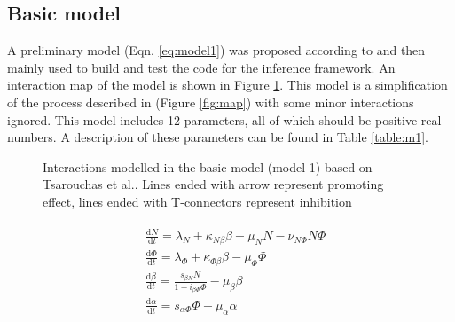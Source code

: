 \subsection{Basic model}

A preliminary model (Eqn. \ref{eq:model1}) was proposed according to \cite{ref:Tsarouchas} and then mainly used to build and test the code for the inference framework. An interaction map of the model is shown in Figure \ref{fig:m1}. This model is a simplification of the process described in \cite{ref:Tsarouchas} (Figure \ref{fig:map}) with some minor interactions ignored. This model includes 12 parameters, all of which should be positive real numbers. A description of these parameters can be found in Table \ref{table:m1}.

\begin{figure}
    \begin{center}
    \end{center}

    \caption[Interactions modelled in the basic model]%
    {Interactions modelled in the basic model (model 1) based on Tsarouchas et al.\cite{ref:Tsarouchas}. Lines ended with arrow represent promoting effect, lines ended with T-connectors represent inhibition}
    \label{fig:m1}

\end{figure}
\begin{align}
    \label{eq:model1}
    \begin{split}
        &\frac{\mathrm{d} N}{\mathrm{d} t}=\lambda_N+\kappa_{N\beta}\beta-\mu_NN-\nu_{N\Phi}N\Phi\\
        &\frac{\mathrm{d} \Phi}{\mathrm{d} t}=\lambda_\Phi+\kappa_{\Phi\beta}\beta-\mu_\Phi\Phi\\
        &\frac{\mathrm{d} \beta}{\mathrm{d} t}=\frac{s_{\beta N}N}{1+i_{\beta\Phi}\Phi}-\mu_\beta\beta\\
        &\frac{\mathrm{d} \alpha}{\mathrm{d} t}=s_{\alpha\Phi}\Phi-\mu_\alpha\alpha
    \end{split}
\end{align}
